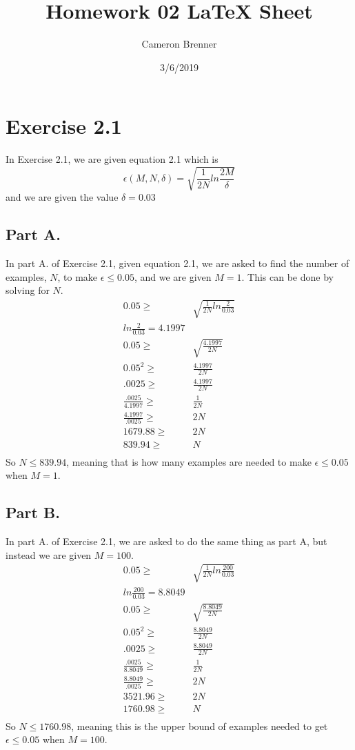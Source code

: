 \documentclass[a4paper]{article}
\begin{document}
\title{Homework 02 \LaTeX{} Sheet}

\author{Cameron Brenner}

\date{3/6/2019}

\maketitle

\section{Exercise 2.1}
In Exercise 2.1, we are given equation 2.1 which is
\begin{equation}
\epsilon (M, N, \delta) = \sqrt{\frac{1}{2N}ln\frac{2M}{\delta}}
\end{equation}
and we are given the value $\delta = 0.03$ 
\subsection{Part A.}
In part A. of Exercise 2.1, given equation 2.1, we are asked to find the number of examples, $N$, to make $\epsilon \leq 0.05$, and we are given $M = 1$. This can be done by solving for $N$.
\begin{align}
0.05  \geq & \sqrt{\frac{1}{2N}ln\frac{2}{0.03}} \\
ln\frac{2}{0.03} = 4.1997 \\
0.05 \geq & \sqrt{\frac{4.1997}{2N}}\\
0.05^2  \geq & \frac{4.1997}{2N}\\
.0025 \geq & \frac{4.1997}{2N}\\
\frac{.0025}{4.1997} \geq & \frac{1}{2N}\\
\frac{4.1997}{.0025} \geq & 2N\\
1679.88 \geq & 2N\\
839.94 \geq & N\\ 
\end{align}
So $N \leq 839.94$, meaning that is how many examples are needed to make  $\epsilon \leq 0.05$ when $M = 1$.
\subsection{Part B.}
In part A. of Exercise 2.1, we are asked to do the same thing as part A, but instead we are given $M = 100$.
\begin{align}
0.05  \geq & \sqrt{\frac{1}{2N}ln\frac{200}{0.03}} \\
ln\frac{200}{0.03} = 8.8049 \\
0.05 \geq & \sqrt{\frac{8.8049}{2N}}\\
0.05^2 \geq & \frac{8.8049}{2N}\\
.0025 \geq & \frac{8.8049}{2N}\\
\frac{.0025}{8.8049} \geq & \frac{1}{2N}\\
\frac{8.8049}{.0025} \geq & 2N\\
3521.96 \geq & 2N\\
1760.98 \geq & N\\ 
\end{align}
So $N \leq 1760.98$, meaning this is the upper bound of examples needed to get $\epsilon \leq 0.05$ when $M = 100$.
\end{document}
